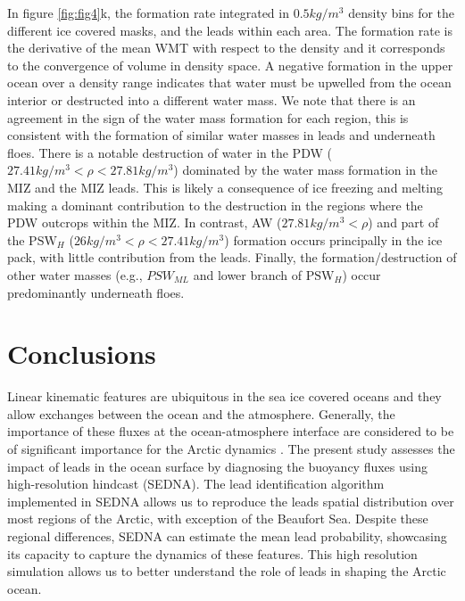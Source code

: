 \documentclass[lineno,sn-basic]{sn-jnl}%
\begin{document}
In figure \ref{fig:fig4}k, the formation rate integrated in $0.5 kg/m^{3}$ density bins for the different ice covered masks, and the leads within each area. The formation rate is the derivative of the mean WMT with respect to the density and it corresponds to the convergence of volume in density space. A negative formation in the upper ocean over a density range indicates that water must be upwelled from the ocean interior or destructed into a different water mass.  We note that there is an agreement in the sign of the water mass formation for each region, this is consistent with the formation of similar water masses in leads and underneath floes. There is a notable destruction of water in the PDW ($27.41 kg/m^3 < \rho < 27.81 kg/m^3$) dominated by the water mass formation in the MIZ and the MIZ leads. This is likely a consequence of ice freezing and melting making a dominant contribution to the destruction in the regions where the PDW outcrops within the MIZ. In contrast, AW ($27.81 kg/m^3 < \rho $) and part of the $\text{PSW}_H$ ($26 kg/m^3 < \rho < 27.41 kg/m^3$) formation occurs principally in the ice pack, with little contribution from the leads. 
Finally, the formation/destruction of other water masses (e.g., $PSW_{ML}$ and lower branch of $\text{PSW}_H$) occur predominantly underneath floes. 

\section{Conclusions}

Linear kinematic features are ubiquitous in the sea ice covered oceans and they allow exchanges between the ocean and the atmosphere. Generally, the importance of these fluxes at the ocean-atmosphere interface are considered to be of significant importance for the Arctic dynamics \citep{Maykut_solar_1995}. The present study assesses the impact of leads in the ocean surface by diagnosing the buoyancy fluxes using high-resolution hindcast (SEDNA). The lead identification algorithm implemented in SEDNA allows us to reproduce the leads spatial distribution over most regions of the Arctic, with exception of the Beaufort Sea. Despite these regional differences, SEDNA can estimate the mean lead probability, showcasing its capacity to capture the dynamics of these features. This high resolution simulation allows us to better understand the role of leads in shaping the Arctic ocean.
\end{document}
